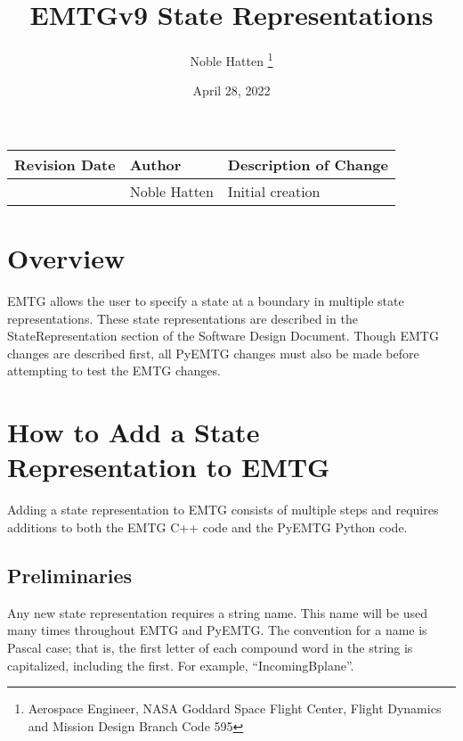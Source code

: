 \documentclass[11pt]{article}
\title{{\Huge EMTGv9 State Representations}}
\author
{
	Noble Hatten \thanks{Aerospace Engineer, NASA Goddard Space Flight Center, Flight Dynamics and Mission Design Branch Code 595}
}
\date{}
\begin{document}
\begin{titlepage}
\maketitle
\begin{table}[H]
	\centering
	\begin{tabular}{|l|l|l|}
		\hline
		\textbf{Revision Date} & \textbf{Author} & \textbf{Description of Change} \\ \hline
		\date{April 28, 2022} & Noble Hatten & Initial creation \\
		\hline
	\end{tabular}
\end{table}
\end{titlepage}



\newpage
\tableofcontents
\thispagestyle{empty}
\newpage

\clearpage
\setcounter{page}{1}



\section{Overview}
\label{sec:overview}

\ac{EMTG} allows the user to specify a state at a boundary in multiple state representations. These state representations are described in the StateRepresentation section of the Software Design Document. Though EMTG changes are described first, all PyEMTG changes must also be made before attempting to test the EMTG changes.

\section{How to Add a State Representation to EMTG}
\label{sec:howToAddAStateRep}

Adding a state representation to \ac{EMTG} consists of multiple steps and requires additions to both the \ac{EMTG} C++ code and the PyEMTG Python code.

\subsection{Preliminaries}
\label{subsec:preliminaries}

Any new state representation requires a string name. This name will be used many times throughout \ac{EMTG} and PyEMTG. The convention for a name is Pascal case; that is, the first letter of each compound word in the string is capitalized, including the first. For example, ``IncomingBplane''.
\end{document}
